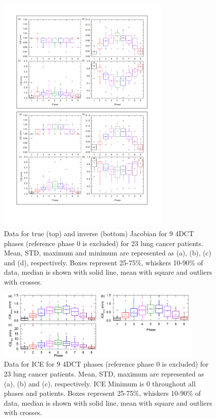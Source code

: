 \documentclass[type=dr, dr=rernat, accentcolor=tud7b,colorbacktitle, bigchapter, openright, twoside, 12pt ]{tudthesis}
\begin{document}
\newpage

\begin{figure}[H]
	\begin{center}		
		\includegraphics[width=0.75\textwidth]{./Images/Jacobian_data.png}
		\caption{Data for true (top) and inverse (bottom) Jacobian for 9 4DCT phases (reference phase 0 is excluded) for 23 lung cancer patients. Mean, STD, maximum and minimum are represented as (a), (b), (c) and (d), respectively.
		Boxes represent 25-75\%, whiskers 10-90\% of data, median is shown with solid line, mean with square and outliers with crosses.}
		\label{jacobian_data}
	\end{center}
\end{figure}

\newpage

\begin{figure}[H]
	\begin{center}		
		\includegraphics[width=0.9\textwidth]{./Images/ICE.png}
		\caption{Data for ICE for 9 4DCT phases (reference phase 0 is excluded) for 23 lung cancer patients. Mean, STD, maximum are represented as (a), (b) and (c), respectively. ICE Minimum is 0 throughout all phases and patients.
		Boxes represent 25-75\%, whiskers 10-90\% of data, median is shown with solid line, mean with square and outliers with crosses.}
		\label{ice}
	\end{center}
\end{figure}
\end{document}
